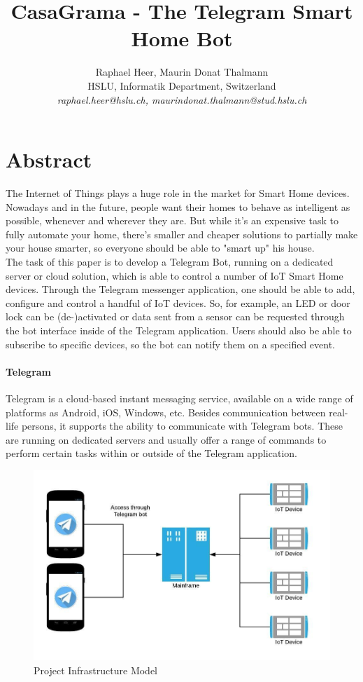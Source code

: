 \documentclass[a4paper]{article}
\title{\textbf{CasaGrama - The Telegram Smart Home Bot}}
\author{Raphael Heer, Maurin Donat Thalmann\\
	HSLU, Informatik Department, Switzerland\\
	\emph{raphael.heer@hslu.ch, maurindonat.thalmann@stud.hslu.ch}}
\begin{document}
	
	\maketitle
	\newpage
	\tableofcontents
	\newpage
	
	\section{Abstract}
	
	The Internet of Things plays a huge role in the market for Smart Home devices. 
	Nowadays and in the future, people want their homes to behave as intelligent as possible, whenever and wherever they are. 
	But while it's an expensive task to fully automate your home, there's smaller and cheaper solutions to partially make your house smarter, so everyone should be able to "smart up" his house. \\
	The task of this paper is to develop a Telegram Bot, running on a dedicated server or cloud solution, which is able to control a number of IoT Smart Home devices. 
	Through the Telegram messenger application, one should be able to add, configure and control a handful of IoT devices. 
	So, for example, an LED or door lock can be (de-)activated or data sent from a sensor can be requested through the bot interface inside of the Telegram application. 
	Users should also be able to subscribe to specific devices, so the bot can notify them on a specified event.
	
	\paragraph{Telegram} 
	Telegram is a cloud-based instant messaging service, available on a wide range of platforms as Android, iOS, Windows, etc. 
	Besides communication between real-life persons, it supports the ability to communicate with Telegram bots. 
	These are running on dedicated servers and usually offer a range of commands to perform certain tasks within or outside of the Telegram application.
	
	\begin{figure}[htb!]
		\centering
		\includegraphics[width=.6\textwidth]{img/project_model.jpeg}
		\caption{Project Infrastructure Model}
	\end{figure}
	
\end{document}
